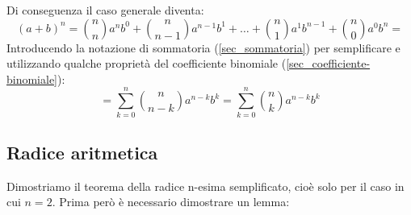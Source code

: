 Di conseguenza il caso generale diventa:
\begin{equation*}
    (a+b)^n = \binom{n}{n} a^n b^0 + \binom{n}{n-1} a^{n-1} b^1 + \dots + 
    \binom{n}{1} a^1b^{n-1} + \binom{n}{0} a^0b^n = 
\end{equation*}
Introducendo la notazione di sommatoria (\ref{sec_sommatoria}) per semplificare 
e utilizzando qualche proprietà del coefficiente binomiale 
(\ref{sec_coefficiente-binomiale}):
\begin{equation*}
    = \sum \limits_{k = 0}^{n} \binom{n}{n-k} a^{n-k}b^k = \sum 
    \limits_{k = 0}^{n} \binom{n}{k} a^{n-k}b^k
\end{equation*}



\subsection{Radice aritmetica} \label{sec_radiceAritmetica}
Dimostriamo il teorema della radice n-esima semplificato, cioè solo per il caso 
in cui $n = 2$. Prima però è necessario dimostrare un lemma:

